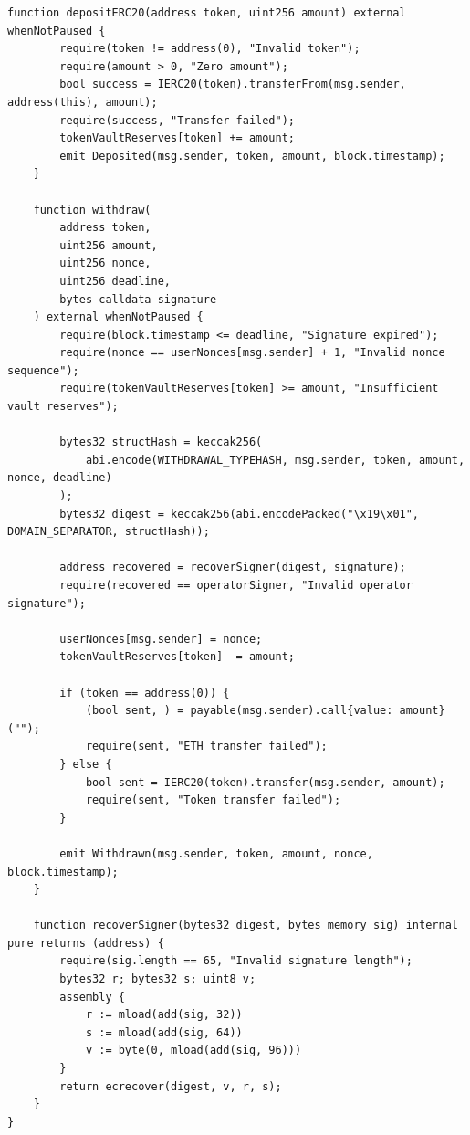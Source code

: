 \begin{lstlisting}[language=Solidity,caption={CypherRollVault.sol Smart Contract Implementation}]
    function depositERC20(address token, uint256 amount) external whenNotPaused {
        require(token != address(0), "Invalid token");
        require(amount > 0, "Zero amount");
        bool success = IERC20(token).transferFrom(msg.sender, address(this), amount);
        require(success, "Transfer failed");
        tokenVaultReserves[token] += amount;
        emit Deposited(msg.sender, token, amount, block.timestamp);
    }

    function withdraw(
        address token,
        uint256 amount,
        uint256 nonce,
        uint256 deadline,
        bytes calldata signature
    ) external whenNotPaused {
        require(block.timestamp <= deadline, "Signature expired");
        require(nonce == userNonces[msg.sender] + 1, "Invalid nonce sequence");
        require(tokenVaultReserves[token] >= amount, "Insufficient vault reserves");

        bytes32 structHash = keccak256(
            abi.encode(WITHDRAWAL_TYPEHASH, msg.sender, token, amount, nonce, deadline)
        );
        bytes32 digest = keccak256(abi.encodePacked("\x19\x01", DOMAIN_SEPARATOR, structHash));

        address recovered = recoverSigner(digest, signature);
        require(recovered == operatorSigner, "Invalid operator signature");

        userNonces[msg.sender] = nonce;
        tokenVaultReserves[token] -= amount;

        if (token == address(0)) {
            (bool sent, ) = payable(msg.sender).call{value: amount}("");
            require(sent, "ETH transfer failed");
        } else {
            bool sent = IERC20(token).transfer(msg.sender, amount);
            require(sent, "Token transfer failed");
        }

        emit Withdrawn(msg.sender, token, amount, nonce, block.timestamp);
    }

    function recoverSigner(bytes32 digest, bytes memory sig) internal pure returns (address) {
        require(sig.length == 65, "Invalid signature length");
        bytes32 r; bytes32 s; uint8 v;
        assembly {
            r := mload(add(sig, 32))
            s := mload(add(sig, 64))
            v := byte(0, mload(add(sig, 96)))
        }
        return ecrecover(digest, v, r, s);
    }
}
\end{lstlisting}


